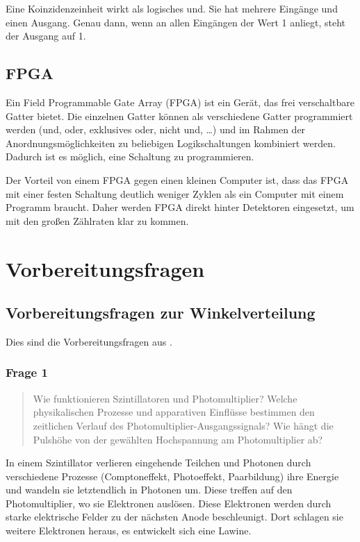 \documentclass[11pt, ngerman, fleqn, DIV=15, headinclude, BCOR=2cm]{scrreprt}
\begin{document}
Eine Koinzidenzeinheit wirkt als logisches und. Sie hat mehrere Eingänge und
einen Ausgang. Genau dann, wenn an allen Eingängen der Wert 1 anliegt, steht
der Ausgang auf 1.

\subsection{FPGA}

Ein Field Programmable Gate Array (FPGA) ist ein Gerät, das frei verschaltbare
Gatter bietet. Die einzelnen Gatter können als verschiedene Gatter programmiert
werden (und, oder, exklusives oder, nicht und, …) und im Rahmen der
Anordnungsmöglichkeiten zu beliebigen Logikschaltungen kombiniert werden.
Dadurch ist es möglich, eine Schaltung zu programmieren.

Der Vorteil von einem FPGA gegen einen kleinen Computer ist, dass das FPGA mit
einer festen Schaltung deutlich weniger Zyklen als ein Computer mit einem
Programm braucht. Daher werden FPGA direkt hinter Detektoren eingesetzt, um mit
den großen Zählraten klar zu kommen.

\section{Vorbereitungsfragen}

\subsection{Vorbereitungsfragen zur Winkelverteilung}

Dies sind die Vorbereitungsfragen aus \parencite[11]{physik512-Anleitung}.

\subsubsection{Frage 1}
\label{sec:frage1-1}

\begin{quote}
    Wie funktionieren Szintillatoren und Photomultiplier? Welche
    physikalischen Prozesse und apparativen Einflüsse bestimmen den
    zeitlichen Verlauf des Photomultiplier-Ausgangssignals? Wie hängt die
    Pulshöhe von der gewählten Hochspannung am Photomultiplier ab?
\end{quote}

In einem Szintillator verlieren eingehende Teilchen und Photonen durch
verschiedene Prozesse (Comptoneffekt, Photoeffekt, Paarbildung) ihre Energie
und wandeln sie letztendlich in Photonen um. Diese treffen auf den
Photomultiplier, wo sie Elektronen auslösen. Diese Elektronen werden durch
starke elektrische Felder zu der nächsten Anode beschleunigt. Dort schlagen sie
weitere Elektronen heraus, es entwickelt sich eine Lawine.
\end{document}
